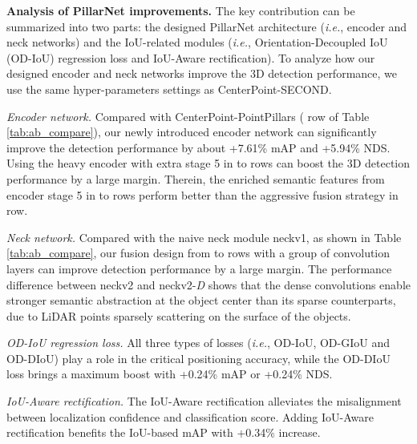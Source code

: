\documentclass[runningheads]{llncs}
\begin{document}
{\flushleft \bf Analysis of PillarNet improvements.}
The key contribution can be summarized into two parts: the designed PillarNet architecture (\textit{i.e.}, encoder and neck networks) and the IoU-related modules (\textit{i.e.}, Orientation-Decoupled IoU (OD-IoU) regression loss and IoU-Aware rectification).
To analyze how our designed encoder and neck networks improve the 3D detection performance, we use the same hyper-parameters settings as CenterPoint-SECOND.


\textit{Encoder network.}
Compared with CenterPoint-PointPillars \cite{lang2019pointpillars} ( row of Table \ref{tab:ab_compare}), our newly introduced encoder network can significantly improve the detection performance by about +7.61\% mAP and +5.94\% NDS.
Using the heavy encoder with extra stage 5 in  to  rows can boost the 3D detection performance by a large margin.
Therein, the enriched semantic features from encoder stage 5 in  to  rows perform better than the aggressive fusion strategy in  row.

\textit{Neck network.}
Compared with the naive neck module neckv1, as shown in Table \ref{tab:ab_compare}, our fusion design from  to  rows with a group of convolution layers can improve detection performance by a large margin.
The performance difference between neckv2 and neckv2-\textit{D} shows that the dense convolutions enable stronger semantic abstraction at the object center than its sparse counterparts, due to LiDAR points sparsely scattering on the surface of the objects. 

\textit{OD-IoU regression loss.}
All three types of losses (\textit{i.e.}, OD-IoU, OD-GIoU and OD-DIoU) play a role in the critical positioning accuracy, while the OD-DIoU loss brings a maximum boost with +0.24\% mAP or +0.24\% NDS. 

\textit{IoU-Aware rectification.} The IoU-Aware rectification  alleviates the misalignment between localization confidence and classification score. 
Adding IoU-Aware rectification benefits the IoU-based mAP with +0.34\% increase.
\end{document}
